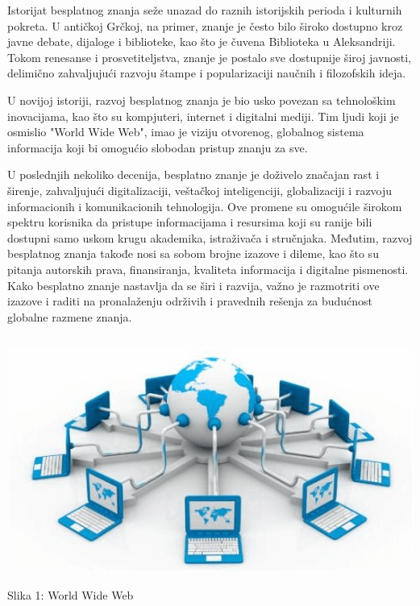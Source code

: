 \documentclass[a4paper]{article}
\begin{document}
{Istorijat besplatnog znanja seže unazad do raznih istorijskih perioda i kulturnih pokreta. U antičkoj Grčkoj, na primer, znanje je često bilo široko dostupno kroz javne debate, dijaloge i biblioteke, kao što je čuvena Biblioteka u Aleksandriji. Tokom renesanse i prosvetiteljstva, znanje je postalo sve dostupnije široj javnosti, delimično zahvaljujući razvoju štampe i popularizaciji naučnih i filozofskih ideja.

U novijoj istoriji, razvoj besplatnog znanja je bio usko povezan sa tehnološkim inovacijama, kao što su kompjuteri, internet i digitalni mediji. Tim ljudi koji je osmislio "World Wide Web", imao je viziju otvorenog, globalnog sistema informacija koji bi omogućio slobodan pristup znanju za sve.

U poslednjih nekoliko decenija, besplatno znanje je doživelo značajan rast i širenje, zahvaljujući digitalizaciji, veštačkoj inteligenciji, globalizaciji i razvoju informacionih i komunikacionih tehnologija. Ove promene su omogućile širokom spektru korisnika da pristupe informacijama i resursima koji su ranije bili dostupni samo uskom krugu akademika, istraživača i stručnjaka.
Međutim, razvoj besplatnog znanja takođe nosi sa sobom brojne izazove i dileme, kao što su pitanja autorskih prava, finansiranja, kvaliteta informacija i digitalne pismenosti. Kako besplatno znanje nastavlja da se širi i razvija, važno je razmotriti ove izazove i raditi na pronalaženju održivih i pravednih rešenja za budućnost globalne razmene znanja.

\setlength{\parskip}{1em}


\begin{verbatim}

\end{verbatim}

\begin{center}
\includegraphics[scale=0.4]{world-wide-web.png}
\end{center}
\caption{Slika 1: World Wide Web}
\label{world wide web}

}
\end{document}

